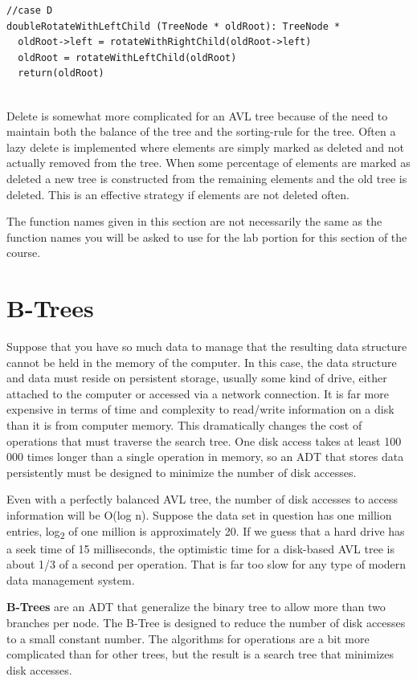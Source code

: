 \begin{lstlisting}
//case D
doubleRotateWithLeftChild (TreeNode * oldRoot): TreeNode *
  oldRoot->left = rotateWithRightChild(oldRoot->left)
  oldRoot = rotateWithLeftChild(oldRoot)
  return(oldRoot)
 	
\end{lstlisting}

Delete is somewhat more complicated for an AVL tree because of the need to maintain both the balance of the tree and the sorting-rule for the tree.   Often a lazy delete is implemented where elements are simply marked as deleted and not actually removed from the tree.  When some percentage of elements are marked as deleted a new tree is constructed from the remaining elements and the old tree is deleted.
This is an effective strategy if elements are not deleted often.

The function names given in this section are not necessarily  the same as the function names you will be asked to use for the lab portion for this section of the course.  

\clearpage
\section{B-Trees}

Suppose that you have so much data to manage that the resulting data structure cannot be held in the memory of the computer. In this case, the data structure and data must reside on persistent storage, usually some kind of drive, either attached to the computer or accessed via a network connection.  It is far more expensive in terms of time and complexity to read/write information on a disk than it is from computer memory. This  dramatically changes the cost of  operations that must traverse the search tree.  One disk access takes at least 100 000 times longer than a single operation in memory, so an ADT that stores data persistently must be designed to minimize the number of disk accesses.  

Even with a perfectly balanced AVL tree, the number of disk accesses to access information will be O(log n).  Suppose the data set in question has one million entries, log\textsubscript{2} of one million is approximately 20. If we guess that a hard drive has a seek time of 15 milliseconds, the optimistic time for a disk-based AVL tree is about 1/3 of a second per operation. That is far too slow for any type of modern data management system.

\textbf{B-Trees} are an ADT that generalize the binary tree to allow more than two branches per node.  The B-Tree is designed to reduce the number of disk accesses to a small constant number. The algorithms for operations are a bit more complicated than for other trees, but the result is a search tree that minimizes disk accesses.

